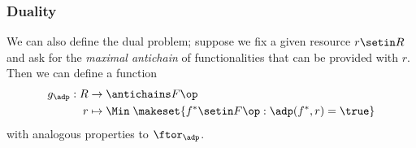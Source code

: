 %
%




\subsubsection{Duality}

We can also define the dual problem; suppose we fix a given resource $r \setin R$ and ask for the \emph{maximal antichain} of functionalities that can be provided with $r$.
Then we can define a function
\begin{equation}
    \begin{aligned}
        g_\adp : R & \to \antichains F\op \\
        r          & \mapsto \Min \; \makeset{ f^* \setin F\op : \adp(f^*, r) = \true }
    \end{aligned}
\end{equation}
with analogous properties to $\ftor_\adp$.

